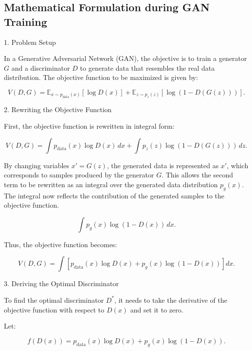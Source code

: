 \subsection{Mathematical Formulation during GAN Training}


1. Problem Setup

In a Generative Adversarial Network (GAN), the objective is to train a generator \( G \) and a discriminator \( D \) 
to generate data that resembles the real data distribution. The objective function to be maximized is given by:

\begin{equation}
    V(D, G) = \mathbb{E}_{x \sim p_{\text{data}}(x)} [\log D(x)] + \mathbb{E}_{z \sim p_{z}(z)} [\log (1 - D(G(z)))].
\end{equation}

2. Rewriting the Objective Function

First, the objective function is rewritten in integral form:

\begin{equation}
    V(D, G) = \int p_{\text{data}}(x) \log D(x) \, dx + \int p_{z}(z) \log (1 - D(G(z))) \, dz.
\end{equation}

By changing variables $x' = G(z)$, the generated data is represented as $x'$, which corresponds to samples produced by the generator $G$. This allows the second term to be rewritten as an integral over the generated data distribution $p_g(x)$. The integral now reflects the contribution of the generated samples to the objective function.

\begin{equation}
    \int p_g(x) \log (1 - D(x)) \, dx.
\end{equation}

Thus, the objective function becomes:

\begin{equation}
    V(D, G) = \int \left[ p_{\text{data}}(x) \log D(x) + p_g(x) \log (1 - D(x)) \right] dx.
\end{equation}

3. Deriving the Optimal Discriminator

To find the optimal discriminator \( D^* \), it needs to take the derivative of the objective function with respect to \( D(x) \) and set it to zero.

Let:

\begin{equation}
    f(D(x)) = p_{\text{data}}(x) \log D(x) + p_g(x) \log (1 - D(x)).
\end{equation}

